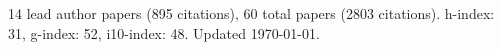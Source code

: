 14 lead author papers (895 citations),
60 total papers (2803 citations).\newline
h-index: 31, g-index: 52, i10-index: 48. Updated \today.